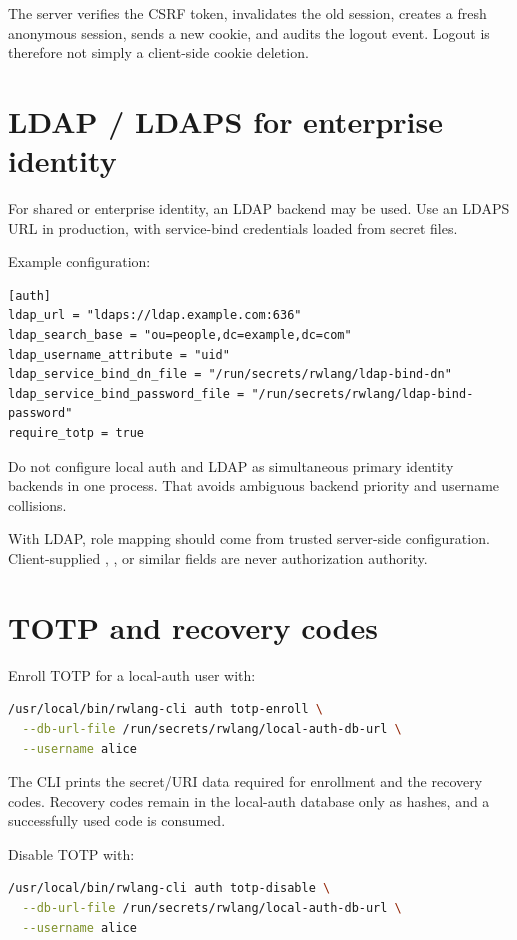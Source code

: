 The server verifies the CSRF token, invalidates the old session, creates a fresh anonymous session, sends a new cookie, and audits the logout event. Logout is therefore not simply a client-side cookie deletion.

\section{LDAP / LDAPS for enterprise identity}

For shared or enterprise identity, an LDAP backend may be used. Use an LDAPS URL in production, with service-bind credentials loaded from secret files.

Example configuration:

\begin{lstlisting}
[auth]
ldap_url = "ldaps://ldap.example.com:636"
ldap_search_base = "ou=people,dc=example,dc=com"
ldap_username_attribute = "uid"
ldap_service_bind_dn_file = "/run/secrets/rwlang/ldap-bind-dn"
ldap_service_bind_password_file = "/run/secrets/rwlang/ldap-bind-password"
require_totp = true
\end{lstlisting}

Do not configure local auth and LDAP as simultaneous primary identity backends in one process. That avoids ambiguous backend priority and username collisions.

With LDAP, role mapping should come from trusted server-side configuration. Client-supplied , , or similar fields are never authorization authority.

\section{TOTP and recovery codes}

Enroll TOTP for a local-auth user with:

\begin{lstlisting}[language=bash]
/usr/local/bin/rwlang-cli auth totp-enroll \
  --db-url-file /run/secrets/rwlang/local-auth-db-url \
  --username alice
\end{lstlisting}

The CLI prints the secret/URI data required for enrollment and the recovery codes. Recovery codes remain in the local-auth database only as hashes, and a successfully used code is consumed.

Disable TOTP with:

\begin{lstlisting}[language=bash]
/usr/local/bin/rwlang-cli auth totp-disable \
  --db-url-file /run/secrets/rwlang/local-auth-db-url \
  --username alice
\end{lstlisting}

